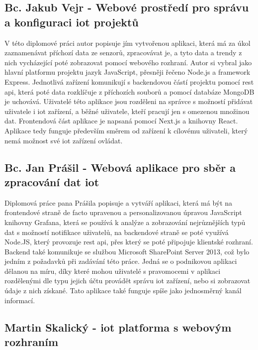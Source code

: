 \subsection{Bc. Jakub Vejr - Webové prostředí pro správu a konfiguraci \acrshort{iot} projektů}

V této diplomové práci autor popisuje jím vytvořenou aplikaci, která má za úkol zaznamenávat příchozí data ze senzorů, zpracovávat je, a tyto data a trendy z nich vycházející poté zobrazovat pomocí webového rozhraní. Autor si vybral jako hlavní platformu projektu jazyk JavaScript, přesněji řečeno Node.js a framework Express. Jednotlivá zařízení komunikují s backendovou částí projektu pomocí \acrshort{rest} \acrshort{api}, která poté data rozklíčuje z příchozích souborů a pomocí databáze MongoDB je uchovává. Uživatelé této aplikace jsou rozděleni na správce s možností přidávat uživatele i \acrshort{iot} zařízení, a běžné uživatele, kteří pracují jen s omezenou množinou dat. Frontendová část aplikace je napsaná pomocí Next.js a knihovny React. Aplikace tedy funguje především směrem od zařízení k cílovému uživateli, který nemá možnost své \acrshort{iot} zařízení ovládat. 

\subsection{Bc. Jan Prášil - Webová aplikace pro sběr a zpracování dat \acrshort{iot}}

Diplomová práce pana Prášila popisuje a vytváří aplikaci, která má být na frontendové straně de facto upravenou a personalizovanou úpravou JavaScript knihovny Grafana, která se používá k analýze a zobrazování nejrůznějších typů dat s možností notifikace uživatelů, na backendové straně se poté využívá Node.JS, který provozuje \acrshort{rest} \acrshort{api}, přes který se poté připojuje klientské rozhraní. Backend také komunikuje se službou Microsoft SharePoint Server 2013, což bylo jedním z požadavků při zadávání této práce. Jedná se o podnikovou aplikaci dělanou na míru, díky které mohou uživatelé s pravomocemi v aplikaci rozdělenými dle typu jejich účtu provádět správu \acrshort{iot} zařízení, nebo si zobrazovat údaje z nich získané. Tato aplikace také funguje spíše jako jednosměrný kanál informací.

\subsection{Martin Skalický - \acrshort{iot} platforma s webovým rozhraním}

